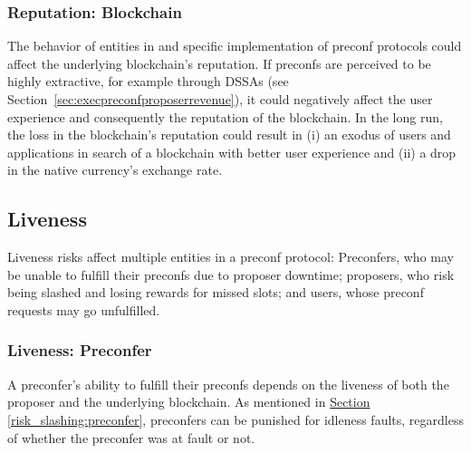 \documentclass[a4paper]{article}
\theoremstyle{boldstyle}
\newcommand{\cm}[1]{\textcolor{blue}{\textbf{Conor:} #1}}
\newcommand{\ks}[1]{\textcolor{purple}{\textbf{Katerina:} #1}}
\begin{document}
    \subsubsection{Reputation: Blockchain}
    \label{risk_reputation:blockchain}
        The behavior of entities in and specific implementation of preconf protocols could affect the underlying blockchain's reputation.
        If preconfs are perceived to be highly extractive, for example through DSSAs (see Section~\ref{sec:execpreconfproposerrevenue}), it could negatively affect the user experience and consequently the reputation of the blockchain. 
        In the long run, the loss in the blockchain's reputation could result in (i) an exodus of users and applications in search of a blockchain with better user experience and (ii) a drop in the native currency’s exchange rate.

\subsection{Liveness} 
    Liveness risks affect multiple entities in a preconf protocol: 
    Preconfers, who may be unable to fulfill their preconfs due to proposer downtime; proposers, who risk being slashed and losing rewards for missed slots; and users, whose preconf requests may go unfulfilled.  

    \subsubsection{Liveness: Preconfer}
    A preconfer's ability to fulfill their preconfs depends on the liveness of both the proposer and the underlying blockchain. 
    As mentioned in \hyperref[risk_slashing:preconfer]{Section \ref{risk_slashing:preconfer}}, preconfers can be punished for idleness faults, regardless of whether the preconfer was at fault or not. 
\end{document}
